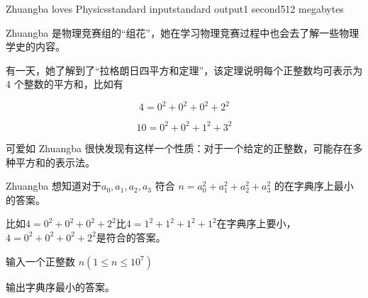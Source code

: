 \begin{problem}{Zhuangba loves Physics}{standard input}{standard output}{1 second}{512 megabytes}

Zhuangba 是物理竞赛组的“组花”，她在学习物理竞赛过程中也会去了解一些物理学史的内容。

有一天，她了解到了“拉格朗日四平方和定理”，该定理说明每个正整数均可表示为 $4$ 个整数的平方和，比如有

$$ 4 = 0^2+0^2+0^2+2^2$$

$$ 10 = 0^2+0^2+1^2+3^2$$

可爱如 Zhuangba 很快发现有这样一个性质：对于一个给定的正整数，可能存在多种平方和的表示法。

Zhuangba 想知道对于$a_0,a_1,a_2,a_3$ 符合 $n=a_0^2+a_1^2+a_2^2+a_3^2$ 的在字典序上最小的答案。

比如$4=0^2+0^2+0^2+2^2$比$4=1^2+1^2+1^2+1^2$在字典序上要小，$4=0^2+0^2+0^2+2^2$是符合的答案。
\InputFile

输入一个正整数 $n(1\le n \le 10^{7})$

\OutputFile

输出字典序最小的答案。

\Example

\begin{example}
%
%
\end{example}

\end{problem}
